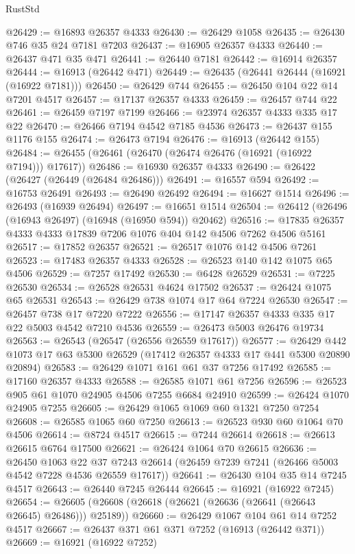 \begin{lexlean}{RustStd}
\begin{coremodule}
@26429 := @16893 @26357 @4333
@26430 := @26429 @1058
@26435 := @26430 @746 @35 @24 @7181 @7203
@26437 := @16905 @26357 @4333
@26440 := @26437 @471 @35 @471
@26441 := @26440 @7181
@26442 := @16914 @26357
@26444 := @16913 (@26442 @471)
@26449 := @26435 (@26441 @26444 (@16921 (@16922 @7181)))
@26450 := @26429 @744
@26455 := @26450 @104 @22 @14 @7201 @4517
@26457 := @17137 @26357 @4333
@26459 := @26457 @744 @22
@26461 := @26459 @7197 @7199
@26466 := @23974 @26357 @4333 @335 @17 @22
@26470 := @26466 @7194 @4542 @7185 @4536
@26473 := @26437 @155 @1176 @155
@26474 := @26473 @7194
@26476 := @16913 (@26442 @155)
@26484 := @26455 (@26461 (@26470 (@26474 @26476 (@16921 (@16922 @7194))) @17617))
@26486 := @16930 @26357 @4333
@26490 := @26422 (@26427 (@26449 (@26484 @26486)))
@26491 := @16557 @594
@26492 := @16753 @26491
@26493 := @26490 @26492
@26494 := @16627 @1514
@26496 := @26493 (@16939 @26494)
@26497 := @16651 @1514
@26504 := @26412 (@26496 (@16943 @26497) (@16948 (@16950 @594)) @20462)
@26516 := @17835 @26357 @4333 @4333 @17839 @7206 @1076 @404 @142 @4506 @7262 @4506 @5161
@26517 := @17852 @26357
@26521 := @26517 @1076 @142 @4506 @7261
@26523 := @17483 @26357 @4333
@26528 := @26523 @140 @142 @1075 @65 @4506
@26529 := @7257 @17492
@26530 := @6428 @26529
@26531 := @7225 @26530
@26534 := @26528 @26531 @4624 @17502
@26537 := @26424 @1075 @65 @26531
@26543 := @26429 @738 @1074 @17 @64 @7224 @26530
@26547 := @26457 @738 @17 @7220 @7222
@26556 := @17147 @26357 @4333 @335 @17 @22 @5003 @4542 @7210 @4536
@26559 := @26473 @5003 @26476 @19734
@26563 := @26543 (@26547 (@26556 @26559 @17617))
@26577 := @26429 @442 @1073 @17 @63 @5300 @26529 (@17412 @26357 @4333 @17 @441 @5300 @20890 @20894)
@26583 := @26429 @1071 @161 @61 @37 @7256 @17492
@26585 := @17160 @26357 @4333
@26588 := @26585 @1071 @61 @7256
@26596 := @26523 @905 @61 @1070 @24905 @4506 @7255 @6684 @24910
@26599 := @26424 @1070 @24905 @7255
@26605 := @26429 @1065 @1069 @60 @1321 @7250 @7254
@26608 := @26585 @1065 @60 @7250
@26613 := @26523 @930 @60 @1064 @70 @4506
@26614 := @8724 @4517
@26615 := @7244 @26614
@26618 := @26613 @26615 @6764 @17500
@26621 := @26424 @1064 @70 @26615
@26636 := @26450
    @1063
    @22
    @37
    @7243
    @26614
    (@26459 @7239 @7241 (@26466 @5003 @4542 @7228 @4536 @26559 @17617))
@26641 := @26430 @104 @35 @14 @7245 @4517
@26643 := @26440 @7245 @26444
@26645 := @16921 (@16922 @7245)
@26654 := @26605 (@26608 (@26618 (@26621 (@26636 (@26641 (@26643 @26645) @26486))) @25189))
@26660 := @26429 @1067 @104 @61 @14 @7252 @4517
@26667 := @26437 @371 @61 @371 @7252 (@16913 (@26442 @371))
@26669 := @16921 (@16922 @7252)

\end{coremodule}
\end{lexlean}
